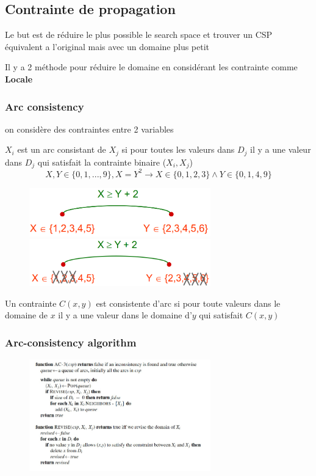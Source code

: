 	\subsection{Contrainte de propagation}
			Le but est de réduire le plus possible le search space et trouver un CSP équivalent a l'original mais avec un domaine plus petit
		
			Il y a 2 méthode pour réduire le domaine en considérant les contrainte comme \textbf{Locale}
			\subsubsection{Arc consistency}
			 on considère des contraintes entre 2 variables
			
				$X_i$ est un arc consistant de $X_j$ si pour toutes les valeurs dans $D_j$ il y a une valeur dans $D_j$ qui satisfait la contrainte binaire ($X_i,X_j$)
				\begin{equation}
					X,Y \in \{0,1,...,9\}, X = Y^2 \rightarrow X \in \{0,1,2,3\} \wedge Y \in \{0,1,4,9\}
				\end{equation}
				
				\begin{figure}[H]
					\centering
					\includegraphics[width=0.7\textwidth]{img/arc.png}
					\includegraphics[width=0.7\textwidth]{img/arc1.png}
				\end{figure}
				
				Un contrainte $C(x,y)$ est consistente d'arc si pour toute valeurs dans le domaine de $x$ il y a une valeur dans le domaine d'$y$ qui satisfait $C(x,y)$
				
		\subsubsection{Arc-consistency algorithm}
			\begin{figure}[htp]
				\centering
				\includegraphics[width=0.7\textwidth]{img/AC-3.png}
			\end{figure}
			
